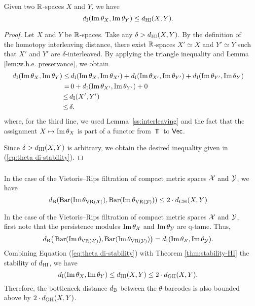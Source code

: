 \subsubsection{}\label{thm:theta stability}

\theorem Given two $\R$-spaces $X$ and $Y$, we have
\begin{equation}\label{eq:theta di-stability}
	\di(\thetamodule{X}, \thetamodule{Y}) \leq \dhi(X,Y).
\end{equation}

\begin{proof}
	Let $X$ and $Y$ be $\R$-spaces. 
	Take any $\delta > \dhi(X,Y)$.
	By the definition of the homotopy interleaving distance, there exist $\R$-spaces $X' \simeq X$ and $Y' \simeq Y$ such that $X'$ and $Y'$ are $\delta$-interleaved.
	By applying the triangle inequality and Lemma \ref{lem:w.h.e. preservance}, we obtain
	\begin{align*}
		\di(\thetamodule{X}, \thetamodule{Y}) \leq& \,
		\di(\thetamodule{X}, \thetamodule{X'}) + \di(\thetamodule{X'}, \thetamodule{Y'}) + \di(\thetamodule{Y'}, \thetamodule{Y}) \\ =& \, 
		0 + \di(\thetamodule{X'}, \thetamodule{Y'}) + 0 \\ \leq \,&
		\di(X',Y') \\ \leq \,&
		\delta.
	\end{align*}
	where, for the third line, we used Lemma~\ref{ss:interleaving} and the fact that the assignment $X \mapsto \thetamodule{X}$ is part of a functor from $\Top$ to $\Vec$.
	
	Since $\delta > \dhi(X,Y)$ is arbitrary, we obtain the desired inequality given in (\ref{eq:theta di-stability}).
\end{proof}

\subsubsection{}
\corollary
In the case of the Vietoris--Rips filtration of compact metric spaces $\cX$ and $\cY$, we have
\[
\db(\thetabarc{\cX}, \thetabarc{\cY}) \leq 2 \cdot \dgh(X,Y)
\]


In the case of the Vietoris--Rips filtration of compact metric spaces $\cX$ and $\cY$, first note that the persistence modules $\thetamodule{\cX}$ and $\thetamodule{\cY}$ are q-tame.
Thus,
\[
\db\big(\thetabarc{\cX}, \thetabarc{\cY}\big) =
\di(\thetamodule{\cX}, \thetamodule{\cY}).
\]
Combining Equation (\ref{eq:theta di-stability}) with Theorem \ref{thm:stability-HI} the stability of $\dhi$, we have
\[
\di(\thetamodule{X}, \thetamodule{Y}) \leq
\dhi(X,Y)\leq 2\cdot \dgh(X,Y).
\]
Therefore, the bottleneck distance $\db$ between the $\theta$-barcodes is also bounded above by $2\cdot \dgh(X,Y)$.

